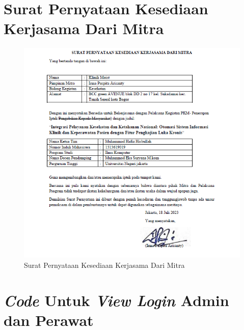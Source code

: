 
\chapter{Surat Pernyataan Kesediaan Kerjasama Dari Mitra}

\begin{figure}[H]
	\centering
	\includegraphics[width=16cm]{gambar/0024.png}
	\caption{Surat Pernyataan Kesediaan Kerjasama Dari Mitra}
	\label{Gambar:pengelolaanantrian2}
\end{figure}

\chapter{\emph{Code} Untuk \emph{View Login} Admin dan Perawat}

